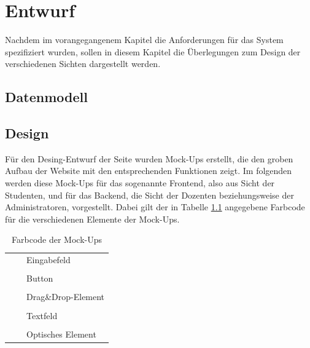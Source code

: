 
\chapter{Entwurf}
\label{chapter:design}
    Nachdem im vorangegangenem Kapitel die Anforderungen für das System spezifiziert wurden, sollen in diesem Kapitel die Überlegungen zum Design der verschiedenen Sichten dargestellt werden.
    
    \section{Datenmodell}
    
    \section{Design}
        Für den Desing-Entwurf der Seite wurden Mock-Ups erstellt, die den groben Aufbau der Website mit den entsprechenden Funktionen zeigt. 
        Im folgenden werden diese Mock-Ups für das sogenannte Frontend, also aus Sicht der Studenten, und für das Backend, die Sicht der Dozenten beziehungsweise der Administratoren, vorgestellt.
        Dabei gilt der in Tabelle \ref{tab:Farbcode} angegebene Farbcode für die verschiedenen Elemente der Mock-Ups.
        \begin{table}
            \centering
            \begin{tabular}{l c| l}
                \cellcolor{red} & & Eingabefeld\\\\
                \cellcolor{orange} & & Button\\\\
                \cellcolor{olive} & & Drag\&Drop-Element\\\\
                \cellcolor{green} & & Textfeld\\\\
                \cellcolor{blue} & & Optisches Element
            \end{tabular}
            \caption{Farbcode der Mock-Ups}
            \label{tab:Farbcode}
        \end{table}
    
